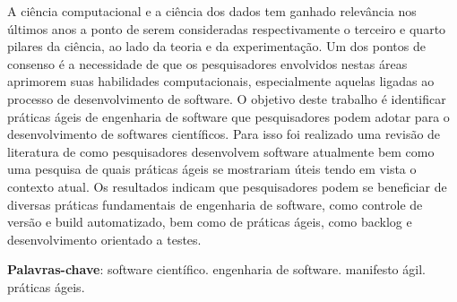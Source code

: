\documentclass[
	article,			%
	11pt,				%
	oneside,			%
	a4paper,			%
	english,			%
	brazil,				%
	sumario=tradicional
	]{abntex2}
\begin{document}

\frenchspacing 


%
%
\maketitle

\begin{resumoumacoluna}
A ciência computacional e a ciência dos dados tem ganhado relevância nos últimos anos a ponto de serem consideradas respectivamente o terceiro e quarto pilares da ciência, ao lado da teoria e da experimentação. Um dos pontos de consenso é a necessidade de que os pesquisadores envolvidos nestas áreas aprimorem suas habilidades computacionais, especialmente aquelas ligadas ao processo de desenvolvimento de software. O objetivo deste trabalho é identificar práticas ágeis de engenharia de software que pesquisadores podem adotar para o desenvolvimento de softwares científicos. Para isso foi realizado uma revisão de literatura de como pesquisadores desenvolvem software atualmente bem como uma pesquisa de quais práticas ágeis se mostrariam úteis tendo em vista o contexto atual. Os resultados indicam que pesquisadores podem se beneficiar de diversas práticas fundamentais de engenharia de software, como controle de versão e build automatizado, bem como de práticas ágeis, como backlog e desenvolvimento orientado a testes. 
 \vspace{\onelineskip}
 
 \noindent
 \textbf{Palavras-chave}: software científico. engenharia de software. manifesto ágil. práticas ágeis.
\end{resumoumacoluna}


\textual

\end{document}
